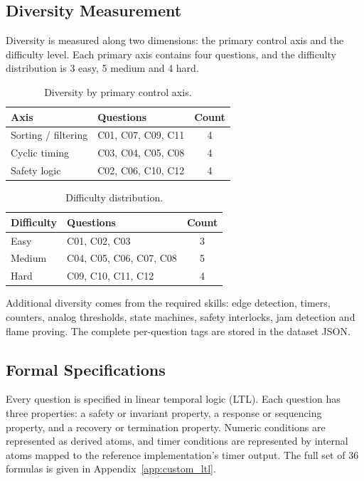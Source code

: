 \subsection{Diversity Measurement}
Diversity is measured along two dimensions: the primary control axis and the difficulty level. Each primary axis contains four questions, and the difficulty distribution is 3 easy, 5 medium and 4 hard.

\begin{table}[htbp]
\centering
\small
\caption{Diversity by primary control axis.}
\label{tab:custom_axes}
\begin{tabular}{|l|l|c|}
\hline
Axis & Questions & Count \\
\hline
Sorting / filtering & C01, C07, C09, C11 & 4 \\
Cyclic timing & C03, C04, C05, C08 & 4 \\
Safety logic & C02, C06, C10, C12 & 4 \\
\hline
\end{tabular}
\end{table}

\begin{table}[htbp]
\centering
\small
\caption{Difficulty distribution.}
\label{tab:custom_difficulty}
\begin{tabular}{|l|l|c|}
\hline
Difficulty & Questions & Count \\
\hline
Easy & C01, C02, C03 & 3 \\
Medium & C04, C05, C06, C07, C08 & 5 \\
Hard & C09, C10, C11, C12 & 4 \\
\hline
\end{tabular}
\end{table}

Additional diversity comes from the required skills: edge detection, timers, counters, analog thresholds, state machines, safety interlocks, jam detection and flame proving. The complete per-question tags are stored in the dataset JSON.

\subsection{Formal Specifications}
Every question is specified in linear temporal logic (LTL). Each question has three properties: a safety or invariant property, a response or sequencing property, and a recovery or termination property. Numeric conditions are represented as derived atoms, and timer conditions are represented by internal atoms mapped to the reference implementation's timer output. The full set of 36 formulas is given in Appendix~\ref{app:custom_ltl}.

